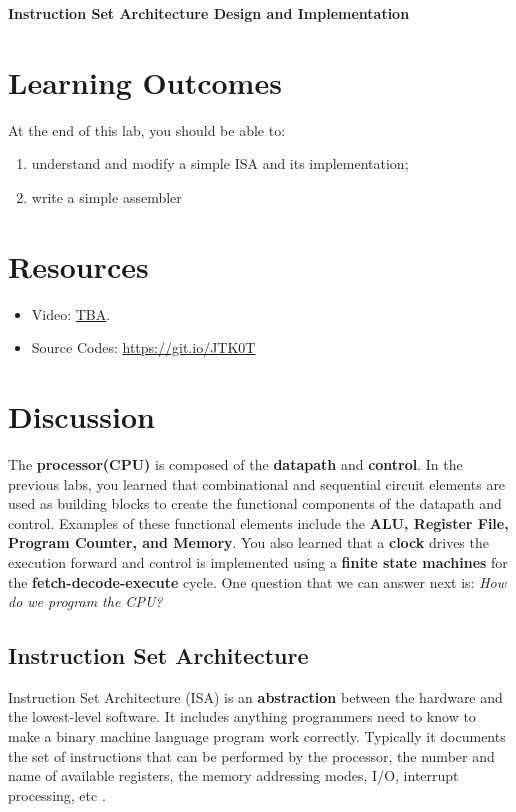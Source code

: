 \documentclass[a4paper, 11pt,oneside]{article}
\begin{document}
\begin{center}
	{\LARGE \textbf{Instruction Set Architecture Design and Implementation}}
\end{center}

\section*{Learning Outcomes}
   At the end of this lab, you should be able to:
   \begin{enumerate}[itemsep=0pt,parsep=0pt]
   	   \item understand and modify a simple ISA and its implementation;
       \item write a simple assembler
   \end{enumerate}   
\tableofcontents

\section{Resources}
\begin{itemize}
	\item Video: \href{TBA}{TBA}.
	\item Source Codes: \href{https://git.io/JTK0T}{https://git.io/JTK0T}
\end{itemize}	

\section{Discussion}
The \textbf{processor(CPU)} is composed of the \textbf{datapath} and 
\textbf{control}. In the previous labs, you learned that combinational and 
sequential circuit elements are used as building blocks to create the 
functional components of the datapath and control. Examples of these functional 
elements include the \textbf{ALU, Register File, Program Counter, and Memory}. 
You also learned that a \textbf{clock} drives the execution forward and control 
is implemented using a \textbf{finite state machines} for the 
\textbf{fetch-decode-execute} cycle. One question that we can answer next is: 
\textit{How do we program the CPU?}


\subsection{Instruction Set Architecture}
Instruction Set Architecture (ISA) is an \textbf{abstraction} between the 
hardware and the lowest-level software. It includes anything programmers need 
to know to make a binary machine language program work correctly. Typically it  
documents the set of instructions that can be performed by the 
processor, the number and name of available registers, the memory 
addressing modes, I/O, interrupt processing, etc \cite{CODARM}.
\end{document}
